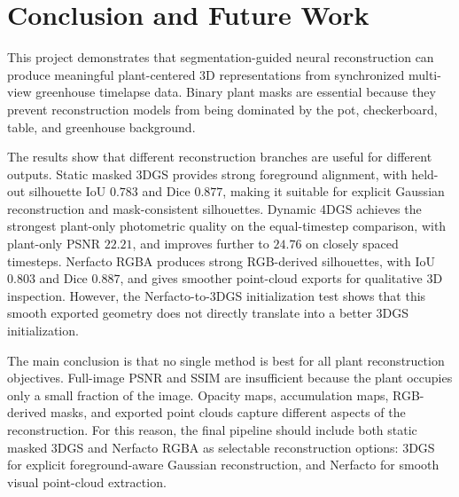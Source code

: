 \documentclass[sigconf]{acmart}
\begin{document}
\section{Conclusion and Future Work}

This project demonstrates that segmentation-guided neural reconstruction can produce meaningful plant-centered 3D representations from synchronized multi-view greenhouse timelapse data. Binary plant masks are essential because they prevent reconstruction models from being dominated by the pot, checkerboard, table, and greenhouse background.

The results show that different reconstruction branches are useful for different outputs. Static masked 3DGS provides strong foreground alignment, with held-out silhouette IoU $0.783$ and Dice $0.877$, making it suitable for explicit Gaussian reconstruction and mask-consistent silhouettes. Dynamic 4DGS achieves the strongest plant-only photometric quality on the equal-timestep comparison, with plant-only PSNR $22.21$, and improves further to $24.76$ on closely spaced timesteps. Nerfacto RGBA produces strong RGB-derived silhouettes, with IoU $0.803$ and Dice $0.887$, and gives smoother point-cloud exports for qualitative 3D inspection. However, the Nerfacto-to-3DGS initialization test shows that this smooth exported geometry does not directly translate into a better 3DGS initialization. 

The main conclusion is that no single method is best for all plant reconstruction objectives. Full-image PSNR and SSIM are insufficient because the plant occupies only a small fraction of the image. Opacity maps, accumulation maps, RGB-derived masks, and exported point clouds capture different aspects of the reconstruction. For this reason, the final pipeline should include both static masked 3DGS and Nerfacto RGBA as selectable reconstruction options: 3DGS for explicit foreground-aware Gaussian reconstruction, and Nerfacto for smooth visual point-cloud extraction.
\end{document}

